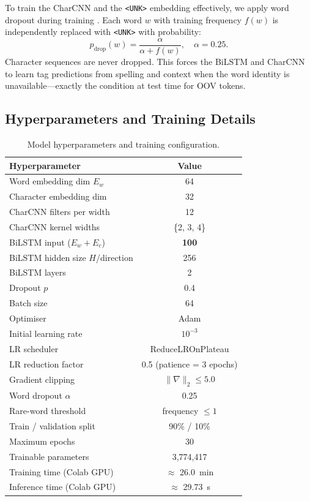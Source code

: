 \documentclass[11pt]{article}
\newcommand{\ParamCount}{3{,}774{,}417}   %
\newcommand{\TrainTime}{26.0}    %
\newcommand{\InferTime}{29.73}   %
\begin{document}
To train the CharCNN and the \texttt{<UNK>} embedding effectively, we apply
word dropout during training \cite{kiperwasser-goldberg-2016-simple}.  Each
word $w$ with training frequency $f(w)$ is independently replaced with
\texttt{<UNK>} with probability:
\begin{equation}
  p_{\text{drop}}(w) = \frac{\alpha}{\alpha + f(w)}, \quad \alpha = 0.25.
\end{equation}
Character sequences are never dropped.  This forces the BiLSTM and CharCNN
to learn tag predictions from spelling and context when the word identity is
unavailable---exactly the condition at test time for OOV tokens.

\subsection{Hyperparameters and Training Details}

\begin{table}[t]
\centering
\small
\begin{tabular}{lc}
\toprule
\textbf{Hyperparameter} & \textbf{Value} \\
\midrule
Word embedding dim $E_w$       & 64 \\
Character embedding dim        & 32 \\
CharCNN filters per width      & 12 \\
CharCNN kernel widths          & \{2, 3, 4\} \\
BiLSTM input ($E_w + E_c$)     & \textbf{100} \\
BiLSTM hidden size $H$/direction & 256 \\
BiLSTM layers                  & 2 \\
Dropout $p$                    & 0.4 \\
Batch size                     & 64 \\
Optimiser                      & Adam \cite{kingma2014adam} \\
Initial learning rate          & $10^{-3}$ \\
LR scheduler                   & ReduceLROnPlateau \\
LR reduction factor            & 0.5 (patience = 3 epochs) \\
Gradient clipping              & $\|\nabla\|_2 \leq 5.0$ \\
Word dropout $\alpha$          & 0.25 \\
Rare-word threshold            & frequency $\leq 1$ \\
Train / validation split       & 90\% / 10\% \\
Maximum epochs                 & 30 \\
\midrule
Trainable parameters           & \ParamCount \\
Training time (Colab GPU)      & $\approx$ \TrainTime~min \\
Inference time (Colab GPU)     & $\approx$ \InferTime~s \\
\bottomrule
\end{tabular}
\caption{Model hyperparameters and training configuration.}
\label{tab:hyperparams}
\end{table}
\end{document}
